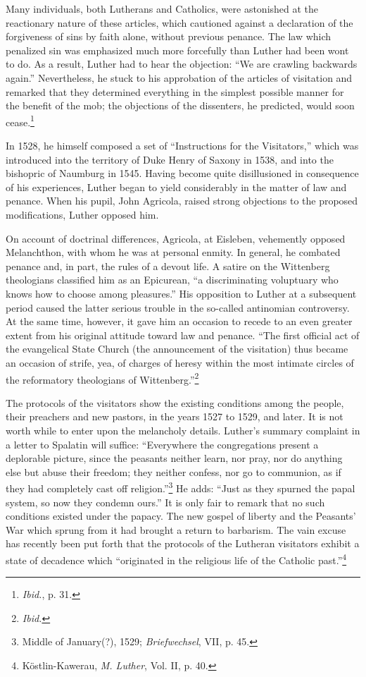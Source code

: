 Many individuals, both Lutherans and Catholics, were astonished
at the reactionary nature of these articles, which cautioned against
a declaration of the forgiveness of sins by faith alone, without previous
penance. The law which penalized sin was emphasized much
more forcefully than Luther had been wont to do. As a result,
Luther had to hear the objection: “We are crawling backwards
again.” Nevertheless, he stuck to his approbation of the articles of
visitation and remarked that they determined everything in the
simplest possible manner for the benefit of the mob; the objections
of the dissenters, he predicted, would soon cease.\footnote{\textit{Ibid.}, p. 31.}

In 1528, he himself composed a set of “Instructions for the Visitators,”
which was introduced into the territory of Duke Henry of
Saxony in 1538, and into the bishopric of Naumburg in 1545. Having become
quite disillusioned in consequence of his experiences,
Luther began to yield considerably in the matter of law and penance.
When his pupil, John Agricola, raised strong objections to the proposed
modifications, Luther opposed him.

On account of doctrinal differences, Agricola, at Eisleben, vehemently
opposed Melanchthon, with whom he was at personal enmity.
In general, he combated penance and, in part, the rules of a devout
life. A satire on the Wittenberg theologians classified him as an
Epicurean, “a discriminating voluptuary who knows how to choose
among pleasures.” His opposition to Luther at a subsequent period
caused the latter serious trouble in the so-called antinomian controversy.
At the same time, however, it gave him an occasion to
recede to an even greater extent from his original attitude toward law
and penance. “The first official act of the evangelical State Church
(the announcement of the visitation) thus became an occasion of
strife, yea, of charges of heresy within the most intimate circles of the
reformatory theologians of Wittenberg.”\footnote{\textit{Ibid.}}

The protocols of the visitators show the existing conditions among
the people, their preachers and new pastors, in the years 1527 to
1529, and later. It is not worth while to enter upon the melancholy
details. Luther’s summary complaint in a letter to Spalatin will suffice:
“Everywhere the congregations present a deplorable picture,
since the peasants neither learn, nor pray, nor do anything else but
abuse their freedom; they neither confess, nor go to communion, as
if they had completely cast off religion.”\footnote
{Middle of January(?), 1529; \textit{Briefwechsel}, VII, p. 45.}
 He adds: “Just as they
spurned the papal system, so now they condemn ours.” It is only fair
to remark that no such conditions existed under the papacy. The new
gospel of liberty and the Peasants’ War which sprung from it had
brought a return to barbarism. The vain excuse has recently been
put forth that the protocols of the Lutheran visitators exhibit a
state of decadence which “originated in the religious life of the Catholic
past.”\footnote{Köstlin-Kawerau, \textit{M. Luther}, Vol. II, p. 40.}

